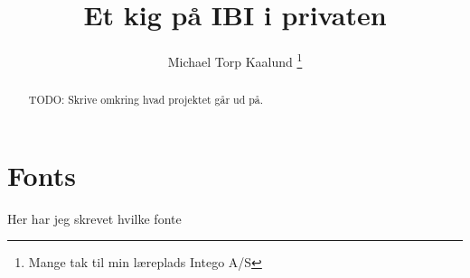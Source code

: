 \documentclass[12pt,a4paper,twoside]{article}
\title{Et kig på IBI i privaten}
\author{Michael Torp Kaalund \thanks{Mange tak til min læreplads Intego A/S}}
\begin{document}
    

    \begin{abstract}
        TODO: Skrive omkring hvad projektet går ud på.
    \end{abstract}

    \newpage

    \tableofcontents

    \newpage

    \section{Fonts}
    Her har jeg skrevet hvilke fonte

    \appendix

    
    
\end{document}
